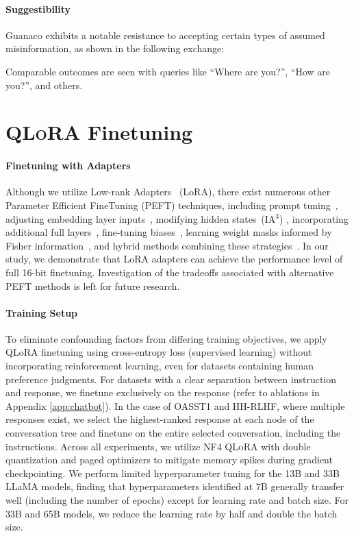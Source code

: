\paragraph{Suggestibility} {Guanaco} exhibits a notable resistance to accepting certain types of assumed misinformation, as shown in the following exchange:

Comparable outcomes are seen with queries like “Where are you?”, “How are you?”, and others.

\section{\textsc{QLoRA} Finetuning}

\paragraph{Finetuning with Adapters} Although we utilize Low-rank Adapters~\citep{hu2021lora} (LoRA), there exist numerous other Parameter Efficient FineTuning (PEFT) techniques, including prompt tuning~\citep{qin2021learning,lester2021power,li2021prefix}, adjusting embedding layer inputs~\citep{an2022input}, modifying hidden states~(IA$^3$) \citep{liu2022few}, incorporating additional full layers~\citep{houlsby2019parameter}, fine-tuning biases~\citep{zaken2021bitfit}, learning weight masks informed by Fisher information~\citep{sung2021training}, and hybrid methods combining these strategies~\citep{henderson2021compacter}. In our study, we demonstrate that LoRA adapters can achieve the performance level of full 16-bit finetuning. Investigation of the tradeoffs associated with alternative PEFT methods is left for future research.

\paragraph{Training Setup} To eliminate confounding factors from differing training objectives, we apply QLoRA finetuning using cross-entropy loss (supervised learning) without incorporating reinforcement learning, even for datasets containing human preference judgments. For datasets with a clear separation between instruction and response, we finetune exclusively on the response (refer to ablations in Appendix \ref{app:chatbot}). In the case of OASST1 and HH-RLHF, where multiple responses exist, we select the highest-ranked response at each node of the conversation tree and finetune on the entire selected conversation, including the instructions. Across all experiments, we utilize NF4 \textsc{QLoRA} with double quantization and paged optimizers to mitigate memory spikes during gradient checkpointing. We perform limited hyperparameter tuning for the 13B and 33B LLaMA models, finding that hyperparameters identified at 7B generally transfer well (including the number of epochs) except for learning rate and batch size. For 33B and 65B models, we reduce the learning rate by half and double the batch size.

